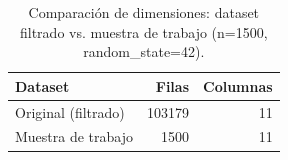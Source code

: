 \begin{table}
\caption{Comparación de dimensiones: dataset filtrado vs. muestra de trabajo (n=1500, random\_state=42).}
\label{tab:dimensiones_muestra}
\begin{tabular}{lrr}
\toprule
Dataset & Filas & Columnas \\
\midrule
Original (filtrado) & 103179 & 11 \\
Muestra de trabajo & 1500 & 11 \\
\bottomrule
\end{tabular}
\end{table}
